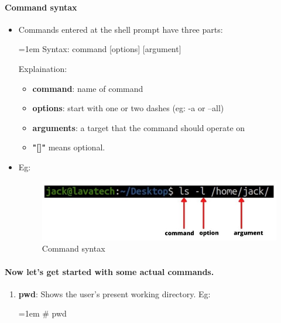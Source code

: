 \begin{flushleft}
\begin{itemize}
	\end{itemize}
		
	\newpage

	\paragraph{Command syntax}
	
	\begin{itemize}
		\item Commands entered at the shell prompt have three parts:
		\bigskip
			\begin{tcolorbox}[breakable,notitle,boxrule=-0pt,colback=pink,colframe=pink]
			\color{black}
			\font=1em
			\bigskip
			Syntax:  command [options] [argument]
			\font=4pt
			\bigskip
		\end{tcolorbox}
		Explaination:
		\begin{itemize}
			\item \textbf{command}: name of command
			\item \textbf{options}: start with one or two dashes (eg: -a or –all)
			\item \textbf{arguments}: a target that the command should operate on
			\item \textbf{"[]"} means optional.
		\end{itemize}

		\item
		Eg:
		\begin{figure}[h!]
			\centering
			\includegraphics[scale=.65]{content/chapter2/images/command_prompt3.jpg}
			\caption{Command syntax}
			\label{fig:command_prompt3}
		\end{figure}
	\end{itemize}

	\newpage
	\paragraph{Now let's get started with some actual commands.}
	
	\begin{enumerate}
		\item \textbf{pwd}: Shows the user’s present working directory.
		\newline
		Eg:
		\begin{tcolorbox}[breakable,notitle,boxrule=-0pt,colback=black,colframe=black]
			\color{green}
			\font=1em
			\# pwd
			\font=4pt
		\end{tcolorbox}
		\bigskip
		\bigskip


\end{enumerate}
\end{flushleft}
